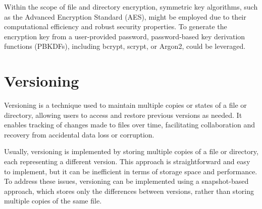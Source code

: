 Within the scope of file and directory encryption, symmetric key algorithms, such as the Advanced Encryption Standard (AES), might be employed due to their computational efficiency and robust security properties.
To generate the encryption key from a user-provided password, password-based key derivation functions (PBKDFs), including bcrypt, scrypt, or Argon2, could be leveraged.


\section{Versioning}\label{sec:versioning}

Versioning is a technique used to maintain multiple copies or states of a file or directory, allowing users to access and restore previous versions as needed.
It enables tracking of changes made to files over time, facilitating collaboration and recovery from accidental data loss or corruption.

Usually, versioning is implemented by storing multiple copies of a file or directory, each representing a different version.
This approach is straightforward and easy to implement, but it can be inefficient in terms of storage space and performance.
To address these issues, versioning can be implemented using a snapshot-based approach, which stores only the differences between versions, rather than storing multiple copies of the same file.